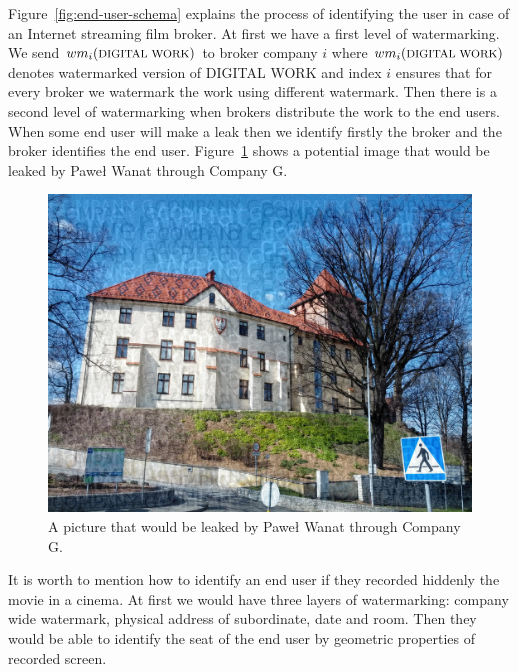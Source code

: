 \documentclass[a4paper,12pt]{article}
\begin{document}
Figure~\ref{fig:end-user-schema} explains the process of identifying the user
in case of an Internet streaming film broker. At first we have a first level of
watermarking. We send $wm_i(\text{\footnotesize DIGITAL WORK})$ to broker company $i$ where
$wm_i(\text{\footnotesize DIGITAL WORK})$ denotes watermarked version of {\footnotesize DIGITAL WORK} and
index $i$ ensures that for every broker we watermark the work using different
watermark. Then there is a second level of watermarking when brokers distribute
the work to the end users. When some end user will make a leak then we identify
firstly the broker and the broker identifies the end user.
Figure~\ref{fig:end-user-example} shows a potential image that would be leaked
by Paweł Wanat through Company G.
\begin{figure}[ht]
  \centering
    \includegraphics[width=1.0\textwidth]{../../images/example-end-user.jpg}
  \caption{A picture that would be leaked by Paweł Wanat through Company G.}
  \label{fig:end-user-example}
\end{figure}
  
It is worth to mention how to identify an end user if they recorded hiddenly
the movie in a cinema. At first we would have three layers of watermarking:
company wide watermark, physical address of subordinate, date and room. Then
they would be able to identify the seat of the end user by geometric properties
of recorded screen.
\end{document}
